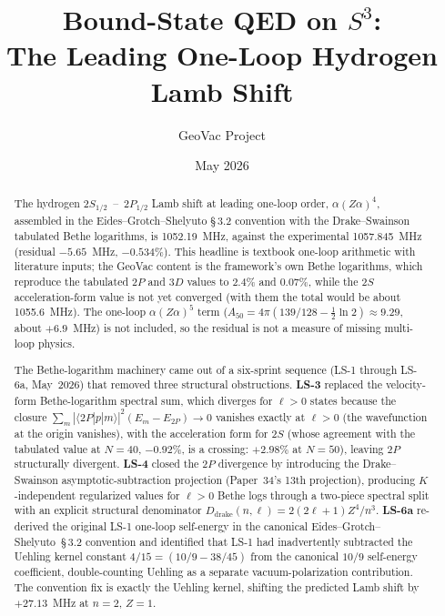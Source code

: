 \documentclass[11pt]{article}
\title{Bound-State QED on $S^3$:\\
The Leading One-Loop Hydrogen Lamb Shift}
\author{GeoVac Project}
\date{May 2026}
\begin{document}
\maketitle

\begin{abstract}
The hydrogen 2$S_{1/2}$~--~2$P_{1/2}$ Lamb shift at leading one-loop
order, $\alpha(Z\alpha)^4$, assembled in the Eides--Grotch--Shelyuto
\S\,3.2 convention with the Drake--Swainson tabulated Bethe
logarithms, is 1052.19~MHz, against the experimental 1057.845~MHz
(residual $-5.65$~MHz, $-0.534\%$).  This headline is textbook
one-loop arithmetic with literature inputs; the GeoVac content is the
framework's own Bethe logarithms, which reproduce the tabulated 2$P$
and 3$D$ values to $2.4\%$ and $0.07\%$, while the 2$S$
acceleration-form value is not yet converged (with them the total
would be about 1055.6~MHz).  The one-loop $\alpha(Z\alpha)^5$ term
($A_{50} = 4\pi(139/128 - \tfrac12\ln 2) \approx 9.29$, about
$+6.9$~MHz) is not included, so the residual is not a measure of
missing multi-loop physics.

The Bethe-logarithm machinery came out of a six-sprint sequence (LS-1
through LS-6a, May~2026) that removed three structural obstructions.
\textbf{LS-3} replaced the velocity-form Bethe-logarithm spectral sum,
which diverges for $\ell > 0$ states because the closure
$\sum_m |\langle 2P|p|m\rangle|^2 (E_m - E_{2P}) \to 0$ vanishes
exactly at $\ell > 0$ (the wavefunction at the origin vanishes), with
the acceleration form for 2$S$ (whose agreement with the tabulated
value at $N = 40$, $-0.92\%$, is a crossing: $+2.98\%$ at $N = 50$),
leaving 2$P$ structurally divergent.  \textbf{LS-4} closed the 2$P$
divergence by introducing the Drake--Swainson asymptotic-subtraction
projection (Paper~34's 13th projection), producing $K$-independent
regularized values for $\ell > 0$ Bethe logs through a two-piece
spectral split with an explicit structural denominator
$D_{\text{drake}}(n,\ell) = 2(2\ell+1)Z^4/n^3$.  \textbf{LS-6a}
re-derived the original LS-1 one-loop self-energy in the canonical
Eides--Grotch--Shelyuto~\S\,3.2 convention and identified that LS-1
had inadvertently subtracted the Uehling kernel constant
$4/15 = (10/9 - 38/45)$ from the canonical $10/9$ self-energy
coefficient, double-counting Uehling as a separate vacuum-polarization
contribution.  The convention fix is exactly the Uehling kernel,
shifting the predicted Lamb shift by $+27.13$~MHz at $n=2$, $Z=1$.


\end{abstract}
\end{document}
